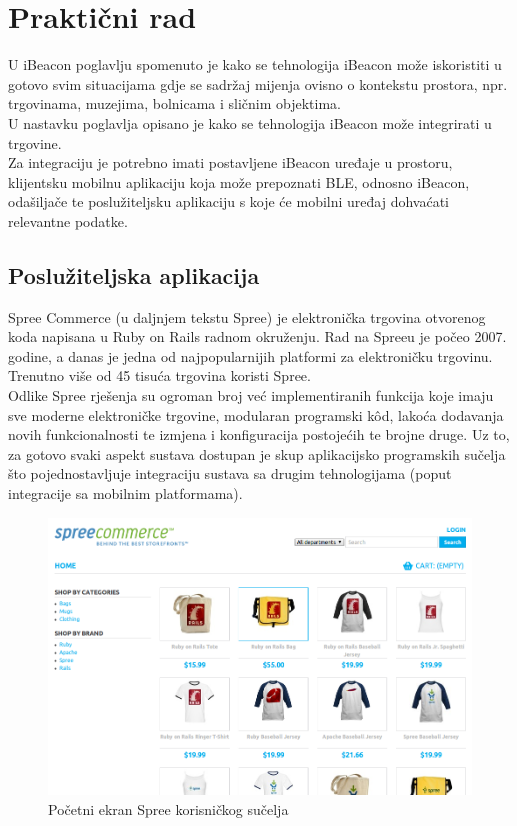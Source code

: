\chapter{Praktični rad}

U iBeacon poglavlju spomenuto je kako se tehnologija iBeacon može iskoristiti u gotovo svim situacijama gdje se sadržaj mijenja ovisno o kontekstu prostora, npr. trgovinama, muzejima, bolnicama i sličnim objektima. 
\\
U nastavku poglavlja opisano je kako se tehnologija iBeacon može integrirati u trgovine. 
\\

Za integraciju je potrebno imati postavljene iBeacon uređaje u prostoru, klijentsku mobilnu aplikaciju koja može prepoznati BLE, odnosno iBeacon, odašiljače te poslužiteljsku aplikaciju s koje će mobilni uređaj dohvaćati relevantne podatke.  

\section*{Poslužiteljska aplikacija}

Spree Commerce (u daljnjem tekstu Spree) je elektronička trgovina  otvorenog koda napisana u Ruby on Rails radnom okruženju. 
Rad na Spreeu je počeo 2007. godine, a danas je jedna od najpopularnijih platformi za elektroničku trgovinu. 
Trenutno više od 45 tisuća trgovina koristi Spree. %
\\
Odlike Spree rješenja su ogroman broj već implementiranih funkcija koje imaju sve moderne elektroničke trgovine, modularan programski kôd, lakoća dodavanja novih funkcionalnosti te izmjena i konfiguracija postojećih te brojne druge. 
Uz to, za gotovo svaki aspekt sustava dostupan je skup aplikacijsko programskih sučelja što pojednostavljuje integraciju sustava sa drugim tehnologijama (poput integracije sa mobilnim platformama).
\\

\begin{figure}[H]
    \centering
    \includegraphics[scale=0.40]{pictures/spree}
    \caption{Početni ekran Spree korisničkog sučelja}
    \label{pic:spree}
\end{figure}

